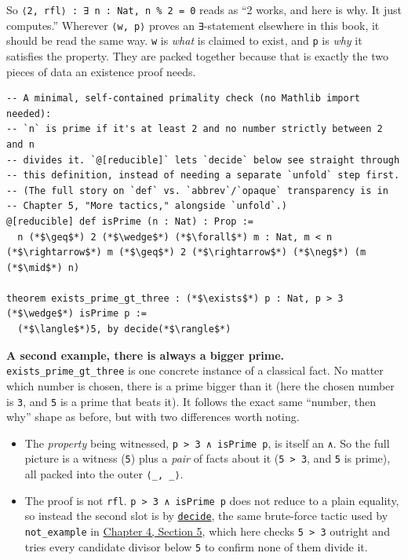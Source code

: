 So \texttt{⟨2, rfl⟩ : ∃ n : Nat, n \% 2 = 0} reads as ``2 works, and here is why. It just computes.'' Wherever \texttt{⟨w, p⟩} proves an \texttt{∃}-statement elsewhere in this book, it should be read the same way. \texttt{w} is \emph{what} is claimed to exist, and \texttt{p} is \emph{why} it satisfies the property. They are packed together because that is exactly the two pieces of data an existence proof needs.

\begin{lstlisting}
-- A minimal, self-contained primality check (no Mathlib import needed):
-- `n` is prime if it's at least 2 and no number strictly between 2 and n
-- divides it. `@[reducible]` lets `decide` below see straight through
-- this definition, instead of needing a separate `unfold` step first.
-- (The full story on `def` vs. `abbrev`/`opaque` transparency is in
-- Chapter 5, "More tactics," alongside `unfold`.)
@[reducible] def isPrime (n : Nat) : Prop :=
  n (*$\geq$*) 2 (*$\wedge$*) (*$\forall$*) m : Nat, m < n (*$\rightarrow$*) m (*$\geq$*) 2 (*$\rightarrow$*) (*$\neg$*) (m (*$\mid$*) n)

theorem exists_prime_gt_three : (*$\exists$*) p : Nat, p > 3 (*$\wedge$*) isPrime p :=
  (*$\langle$*)5, by decide(*$\rangle$*)
\end{lstlisting}

\textbf{A second example, there is always a bigger prime.} \texttt{exists\_\allowbreak{}prime\_\allowbreak{}gt\_\allowbreak{}three} is one concrete instance of a classical fact. No matter which number is chosen, there is a prime bigger than it (here the chosen number is \texttt{3}, and \texttt{5} is a prime that beats it). It follows the exact same ``number, then why'' shape as before, but with two differences worth noting.

\begin{itemize}
\tightlist
\item
  The \emph{property} being witnessed, \texttt{p > 3 ∧ isPrime p}, is itself an \texttt{∧}. So the full picture is a witness (\texttt{5}) plus a \emph{pair} of facts about it (\texttt{5 > 3}, and \texttt{5} is prime), all packed into the outer \texttt{⟨\_\allowbreak{}, \_\allowbreak{}⟩}.
\item
  The proof is not \texttt{rfl}. \texttt{p > 3 ∧ isPrime p} does not reduce to a plain equality, so instead the second slot is by \href{https://lean-lang.org/doc/reference/latest/Tactic-Proofs/Tactic-Reference/}{\texttt{decide}}, the same brute-force tactic used by \texttt{not\_\allowbreak{}example} in \hyperref[sec:04-propositions-and-proofs:05-and-or-not:1]{Chapter 4, Section 5}, which here checks \texttt{5 > 3} outright and tries every candidate divisor below \texttt{5} to confirm none of them divide it.
\end{itemize}

